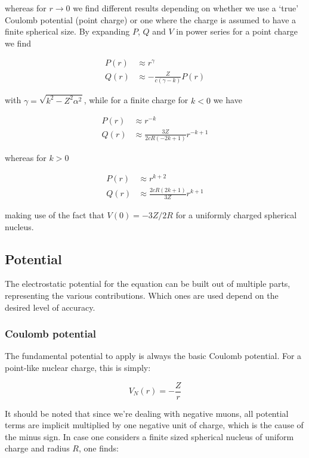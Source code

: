\documentclass[]{report}
\begin{document}
whereas for $r \rightarrow 0$ we find different results depending on whether we use a `true' Coulomb potential (point charge) or one where the charge is assumed to have a finite spherical size. By expanding $P$, $Q$ and $V$ in power series for a point charge we find \cite{grant2009}

\begin{align}
P(r) &\approx r^{\gamma} \\
Q(r) &\approx -\frac{Z}{c(\gamma-k)}P(r)
\end{align}

with $\gamma = \sqrt{k^2-Z^2\alpha^2}$, while for a finite charge for $k < 0$ we have

\begin{align}
P(r) &\approx r^{-k} \\
Q(r) &\approx \frac{3Z}{2cR(-2k+1)}r^{-k+1}
\end{align}

whereas for $k > 0$

\begin{align}
P(r) &\approx r^{k+2} \\
Q(r) &\approx \frac{2cR(2k+1)}{3Z}r^{k+1}
\end{align}

making use of the fact that $V(0) = -3Z/2R$ for a uniformly charged spherical nucleus.

\subsection{Potential}\label{num_pot}

The electrostatic potential for the equation can be built out of multiple parts, representing the various contributions. Which ones are used depend on the desired level of accuracy.

\subsubsection{Coulomb potential}

The fundamental potential to apply is always the basic Coulomb potential. For a point-like nuclear charge, this is simply:

\begin{equation}
	V_N(r) = -\frac{Z}{r}
\end{equation}

It should be noted that since we're dealing with negative muons, all potential terms are implicit multiplied by one negative unit of charge, which is the cause of the minus sign. In case one considers a finite sized spherical nucleus of uniform charge and radius $R$, one finds:
\end{document}
